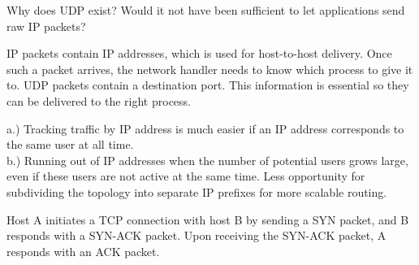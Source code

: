 \documentclass[answers,addpoints]{exam}
\begin{document}
\begin{questions}
\question
Why does UDP exist? Would it not have been sufficient to let applications send raw IP packets?
\fillwithdottedlines{1in}

\begin{solution}
IP packets contain IP addresses, which is used for host-to-host delivery. Once such a packet arrives, the network handler needs to know which process to give it to. UDP packets contain a destination port. This information is essential so they can be delivered to the right process.


\end{solution}

\question
{}
\begin{solution}
a.) Tracking traffic by IP address is much easier if an IP address corresponds to the same user at all time.\\
b.) Running out of IP addresses when the number of potential users grows large, even if these users are not active at the same time. Less opportunity for subdividing the topology into separate IP prefixes for more scalable routing.\\

\end{solution}


\question
Host A initiates a TCP connection with host B by sending a SYN packet, and B responds with a SYN-ACK packet. Upon receiving the SYN-ACK packet, A responds with an ACK packet. 
\end{questions}
\end{document}
